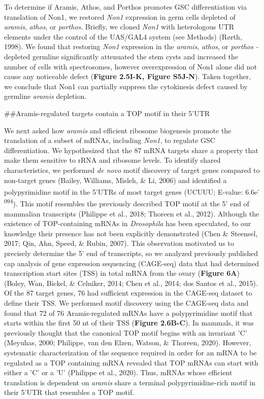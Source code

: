 \documentclass[12pt,twoside]{reedthesis}
\begin{document}
To determine if Aramis, Athos, and Porthos promotes GSC differentiation
via translation of Non1, we restored \emph{Non1} expression in germ cells
depleted of \emph{aramis}, \emph{athos}, or \emph{porthos}. Briefly, we cloned \emph{Non1}
with heterologous UTR elements under the control of the UAS/GAL4 system
(see Methods) (Rørth, 1998). We found that
restoring \emph{Non1} expression in the \emph{aramis}, \emph{athos}, or \emph{porthos
-}depleted germline significantly attenuated the stem cysts and
increased the number of cells with spectrosomes, however overexpression
of Non1 alone did not cause any noticeable defect (\textbf{Figure 2.5I-K, Figure
S5J-N}). Taken together, we conclude that Non1 can partially suppress
the cytokinesis defect caused by germline \emph{aramis} depletion.

\#\#Aramis-regulated targets contain a TOP motif in their 5'UTR

We next asked how \emph{aramis} and efficient ribosome biogenesis promote the
translation of a subset of mRNAs, including \emph{Non1}, to regulate GSC
differentiation. We hypothesized that the 87 mRNA targets share a
property that make them sensitive to rRNA and ribosome levels. To
identify shared characteristics, we performed \emph{de novo} motif discovery
of target genes compared to non-target genes (Bailey, Williams, Misleh, \& Li, 2006) and
identified a polypyrimidine motif in the 5'UTRs of most target genes
(UCUUU; E-value: 6.6e\textsuperscript{-094}). This motif resembles the previously
described TOP motif at the 5' end of mammalian transcripts
(Philippe et al., 2018; Thoreen et al., 2012). Although the existence of
TOP-containing mRNAs in \emph{Drosophila} has been speculated, to our
knowledge their presence has not been explicitly demonstrated
(Chen \& Steensel, 2017; Qin, Ahn, Speed, \& Rubin, 2007). This observation motivated us to
precisely determine the 5' end of transcripts, so we analyzed previously
published {c}ap {a}nalysis of {g}ene
{e}xpression sequencing (CAGE-seq) data that had determined
transcription start sites (TSS) in total mRNA from the ovary (\textbf{Figure
6A}) (Boley, Wan, Bickel, \& Celniker, 2014; Chen et al., 2014; dos Santos et al., 2015). Of the 87 target genes,
76 had sufficient expression in the CAGE-seq dataset to define their
TSS. We performed motif discovery using the CAGE-seq data and found that
72 of 76 Aramis-regulated mRNAs have a polypyrimidine motif that starts
within the first 50 nt of their TSS (\textbf{Figure 2.6B-C}). In mammals, it
was previously thought that the canonical TOP motif begins with an
invariant 'C' (Meyuhas, 2000; Philippe, van den Elzen, Watson, \& Thoreen, 2020). However, systematic
characterization of the sequence required in order for an mRNA to be
regulated as a TOP containing mRNA revealed that TOP mRNAs can start
with either a 'C' or a 'U' (Philippe et al., 2020). Thus,
mRNAs whose efficient translation is dependent on \emph{aramis} share a
terminal polypyrimidine-rich motif in their 5'UTR that resembles a TOP
motif.
\end{document}

